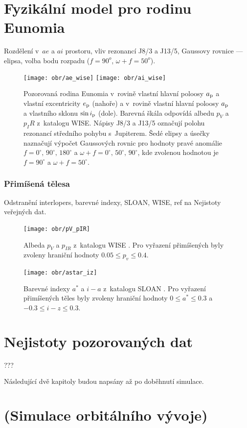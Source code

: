 \documentclass[A4paper, 12pt, oneside]{book}
\begin{document}
\section{Fyzikální model pro rodinu Eunomia}
Rozdělení v~$ae$ a $ai$ prostoru, vliv rezonancí J8/3 a J13/5, Gaussovy rovnice --- elipsa, volba bodu rozpadu ($f=90^o$, $\omega+f=50^o$).
\begin{figure}[!htb]
	\centering
	\texttt{[image: obr/ae\_wise]}
	\texttt{[image: obr/ai\_wise]}
	\caption{Pozorovaná rodina Eunomia v~rovině vlastní hlavní poloosy $a_{\rm p}$ a vlastní excentricity $e_{\rm p}$ (nahoře) a v~rovině vlastní hlavní poloosy $a_{\rm p}$ a vlastního sklonu $\sin i_{\rm p}$ (dole). Barevná škála odpovídá albedu $p_V$ a $p_IR$ z~katalogu WISE. Nápisy J8/3 a J13/5 označují polohu rezonancí středního pohybu s~Jupiterem. Šedé elipsy a úsečky naznačují výpočet Gaussových rovnic pro hodnoty pravé anomálie $f=0^\circ,\,90^\circ,\,180^\circ$ a $\omega+f=0^\circ,\, 50^\circ,\, 90^\circ$, kde zvolenou hodnotou je $f=90^\circ$ a $\omega+f=50^\circ$.}
	\label{fig:ae_ai_wise}
\end{figure}
\subsubsection{Přimíšená tělesa}
Odstranění interlopers, barevné indexy, SLOAN, WISE, ref na Nejistoty veřejných dat.
\begin{figure}[!htb]
	\centering
	\texttt{[image: obr/pV\_pIR]}
	\caption{Albeda $p_V$ a $p_{IR}$ z~katalogu WISE \cite{nugent15}. Pro vyřazení přimíšených byly zvoleny hraniční hodnoty $0.05 \leq p_v \leq 0.4$.}
	\label{fig:pV_pIR}
\end{figure}
\begin{figure}[!htb]
	\centering
	\texttt{[image: obr/astar\_iz]}
	\caption{Barevné indexy $a^*$ a $i-a$ z~katalogu SLOAN \cite{ivezic01}. Pro vyřazení přimíšených těles byly zvoleny hraniční hodnoty $0\leq a^* \leq 0.3$ a $-0.3\leq i-z \leq 0.3$.}
	\label{fig:astar_iz}
\end{figure}
\section{Nejistoty pozorovaných dat}
???

Následující dvě kapitoly budou napsány až po doběhnutí simulace. 
\section{(Simulace orbitálního vývoje)}
\end{document}
